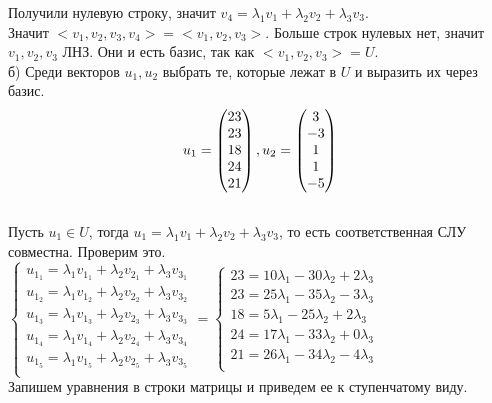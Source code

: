 \documentclass[12pt, a4paper]{article}
\begin{document}
	 Получили нулевую строку, значит $v_4 = \lambda_1 v_1 + \lambda_2 v_2 + \lambda_3 v_3$. \\
	 
	 Значит $<v_1, v_2, v_3, v_4> = <v_1, v_2, v_3>$. Больше строк нулевых нет, значит $v_1, v_2, v_3$ ЛНЗ. Они и есть базис, так как $<v_1, v_2, v_3> = U$. \\
	 
	 б) Среди векторов $u_1, u_2$ выбрать те, которые лежат в $U$ и выразить их через базис. \\
	 
	 \[u_1 = \begin{pmatrix} 23 \\23 \\ 18 \\ 24 \\ 21 \end{pmatrix}, 
	   u_2 = \begin{pmatrix} 3 \\-3 \\ 1 \\ 1 \\ -5 \end{pmatrix}\] \\
	   
	 Пусть $u_1 \in U$, тогда $u_1 = \lambda_1 v_1 + \lambda_2 v_2 + \lambda_3 v_3$, то есть соответственная СЛУ совместна. Проверим это. \\
	 
	 $\begin{cases} u_{1_1} = \lambda_1 v_{1_1} + \lambda_2 v_{2_1} + \lambda_3 v_{3_1} \\ 
	 u_{1_2} = \lambda_1 v_{1_2} + \lambda_2 v_{2_2} + \lambda_3 v_{3_2} \\
	 u_{1_3} = \lambda_1 v_{1_3} + \lambda_2 v_{2_3} + \lambda_3 v_{3_3} \\
	 u_{1_4} = \lambda_1 v_{1_4} + \lambda_2 v_{2_4} + \lambda_3 v_{3_4} \\
	 u_{1_5} = \lambda_1 v_{1_5} + \lambda_2 v_{2_5} + \lambda_3 v_{3_5} \\
	 \end{cases} = 
	 \begin{cases} 23 = 10\lambda_1  -30\lambda_2 + 2\lambda_3 \\ 
	 23 = 25\lambda_1 -35\lambda_2 -3\lambda_3 \\
	 18 = 5\lambda_1 -25\lambda_2 + 2\lambda_3 \\
	 24 = 17\lambda_1 -33\lambda_2 + 0\lambda_3 \\
	 21 = 26\lambda_1 -34\lambda_2 - 4\lambda_3 \\
	 \end{cases}
	 $ \\
	 
	 Запишем уравнения в строки матрицы и приведем ее к ступенчатому виду. \\
	 
\end{document}
